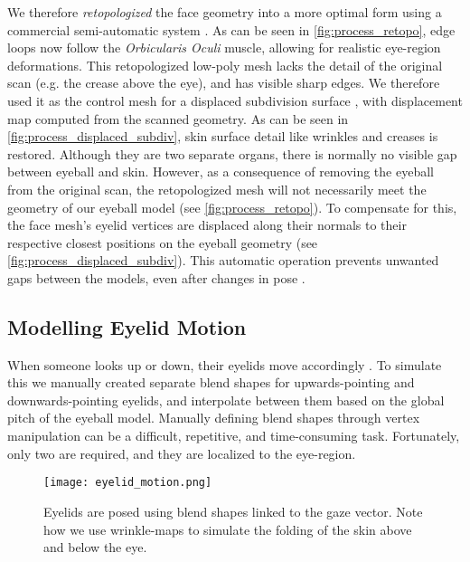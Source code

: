 
We therefore \emph{retopologized} the face geometry into a more optimal form using a commercial semi-automatic system \cite{ZRemesher}.
As can be seen in \autoref{fig:process_retopo}, edge loops now follow the \emph{Orbicularis Oculi} muscle, allowing for realistic eye-region deformations.
This retopologized low-poly mesh lacks the detail of the original scan (e.g. the crease above the eye), and has visible sharp edges.
We therefore used it as the control mesh for a displaced subdivision surface \cite{lee2000displaced}, with displacement map computed from the scanned geometry.
As can be seen in \autoref{fig:process_displaced_subdiv}, skin surface detail like wrinkles and creases is restored.
Although they are two separate organs, there is normally no visible gap between eyeball and skin.
However, as a consequence of removing the eyeball from the original scan, the retopologized mesh will not necessarily meet the geometry of our eyeball model (see \autoref{fig:process_retopo}).
To compensate for this, the face mesh's eyelid vertices are displaced along their normals to their respective closest positions on the eyeball geometry (see \autoref{fig:process_displaced_subdiv}).
This automatic operation prevents unwanted gaps between the models, even after changes in pose \cite{Shrinkwrap}.

\subsection{Modelling Eyelid Motion}

When someone looks up or down, their eyelids move accordingly \cite{liversedge2011oxford}.
To simulate this we manually created separate blend shapes for upwards-pointing and downwards-pointing eyelids, and interpolate between them based on the global pitch of the eyeball model.
Manually defining blend shapes through vertex manipulation can be a difficult, repetitive, and time-consuming task. Fortunately, only two are required, and they are localized to the eye-region.

\begin{figure}
    \texttt{[image: eyelid\_motion.png]}
    \caption{Eyelids are posed using blend shapes linked to the gaze vector. Note how we use wrinkle-maps to simulate the folding of the skin above and below the eye.}
\end{figure}

